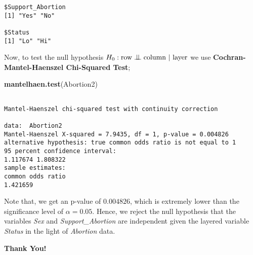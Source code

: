 \documentclass[12pt]{article}
\newenvironment{Shaded}{\begin{snugshade}}{\end{snugshade}}
\newcommand{\KeywordTok}[1]{\textcolor[rgb]{0.13,0.29,0.53}{\textbf{#1}}}
\newcommand{\NormalTok}[1]{#1}
\newcommand{\indep}{\mathrel{\text{\scalebox{1.07}{$\perp\mkern-10mu\perp$}}}}
\begin{document}
\begin{enumerate}
\begin{solution}
\begin{verbatim}
$Support_Abortion
[1] "Yes" "No" 

$Status
[1] "Lo" "Hi"
\end{verbatim}

Now, to test the null hypothesis
\(H_0: \text{row} \indep \text{column } | \text{ layer} \) we use
\textbf{Cochran-Mantel-Haenszel Chi-Squared Test};

\begin{Shaded}
		\KeywordTok{mantelhaen.test}\NormalTok{(Abortion2)}
\end{Shaded}

\begin{verbatim}

Mantel-Haenszel chi-squared test with continuity correction

data:  Abortion2
Mantel-Haenszel X-squared = 7.9435, df = 1, p-value = 0.004826
alternative hypothesis: true common odds ratio is not equal to 1
95 percent confidence interval:
1.117674 1.808322
sample estimates:
common odds ratio 
1.421659 
\end{verbatim}

Note that, we get an p-value of \(0.004826\), which is extremely lower
than the significance level of \(\alpha = 0.05\). Hence, we reject the
null hypothesis that the variables \emph{Sex} and
\emph{Support\_Abortion} are independent given the layered variable
\emph{Status} in the light of \emph{Abortion} data.
\end{solution}
\end{enumerate}

\begin{center}
	\large
	\textbf{Thank You!}
\end{center}
\end{document}
